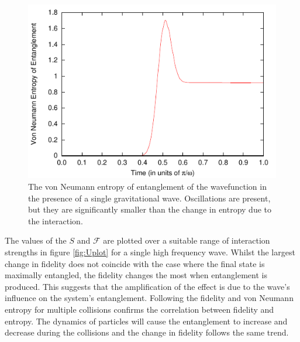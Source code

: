 \begin{figure}[htbp]
  \begin{center}
    \includegraphics[width=120mm]{Images/EntanglementSingleWave.pdf}
    \caption{\label{fig:EntanglementSingle} The von Neumann entropy of
      entanglement of the wavefunction in the presence of a single
      gravitational wave. Oscillations are present, but they are
      significantly smaller than the change in entropy due to the
      interaction.}
  \end{center}
\end{figure}

The values of the $S$ and $\mathcal{F}$ are plotted over a suitable
range of interaction strengths in figure \ref{fig:Uplot} for a single
high frequency wave. Whilst the largest change in fidelity does not
coincide with the case where the final state is maximally entangled,
the fidelity changes the most when entanglement is produced. This
suggests that the amplification of the effect is due to the wave's
influence on the system's entanglement. Following the fidelity and von
Neumann entropy for multiple collisions confirms the correlation
between fidelity and entropy. The dynamics of particles will cause the
entanglement to increase and decrease during the collisions and the
change in fidelity follows the same trend.

